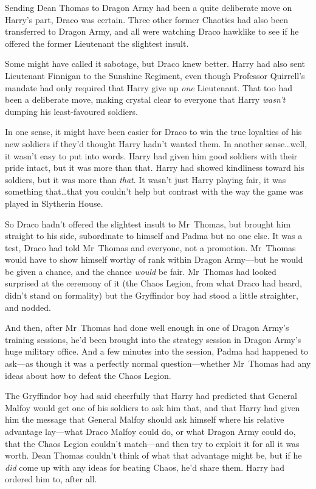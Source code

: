 Sending Dean Thomas to Dragon Army had been a quite deliberate move on Harry’s part, Draco was certain. Three other former Chaotics had also been transferred to Dragon Army, and all were watching Draco hawklike to see if he offered the former Lieutenant the slightest insult.

Some might have called it sabotage, but Draco knew better. Harry had also sent Lieutenant Finnigan to the Sunshine Regiment, even though Professor Quirrell’s mandate had only required that Harry give up \emph{one} Lieutenant. That too had been a deliberate move, making crystal clear to everyone that Harry \emph{wasn’t} dumping his least-favoured soldiers.

In one sense, it might have been easier for Draco to win the true loyalties of his new soldiers if they’d thought Harry hadn’t wanted them. In another sense…well, it wasn’t easy to put into words. Harry had given him good soldiers with their pride intact, but it was more than that. Harry had showed kindliness toward his soldiers, but it was more than \emph{that}. It wasn’t just Harry playing fair, it was something that…that you couldn’t help but contrast with the way the game was played in Slytherin House.

So Draco hadn’t offered the slightest insult to Mr~Thomas, but brought him straight to his side, subordinate to himself and Padma but no one else. It was a test, Draco had told Mr~Thomas and everyone, not a promotion. Mr~Thomas would have to show himself worthy of rank within Dragon Army—but he would be given a chance, and the chance \emph{would} be fair. Mr~Thomas had looked surprised at the ceremony of it (the Chaos Legion, from what Draco had heard, didn’t stand on formality) but the Gryffindor boy had stood a little straighter, and nodded.

And then, after Mr~Thomas had done well enough in one of Dragon Army’s training sessions, he’d been brought into the strategy session in Dragon Army’s huge military office. And a few minutes into the session, Padma had happened to ask—as though it was a perfectly normal question—whether Mr~Thomas had any ideas about how to defeat the Chaos Legion.

The Gryffindor boy had said cheerfully that Harry had predicted that General Malfoy would get one of his soldiers to ask him that, and that Harry had given him the message that General Malfoy should ask himself where his relative advantage lay—what Draco Malfoy could do, or what Dragon Army could do, that the Chaos Legion couldn’t match—and then try to exploit it for all it was worth. Dean Thomas couldn’t think of what that advantage might be, but if he \emph{did} come up with any ideas for beating Chaos, he’d share them. Harry had ordered him to, after all.

